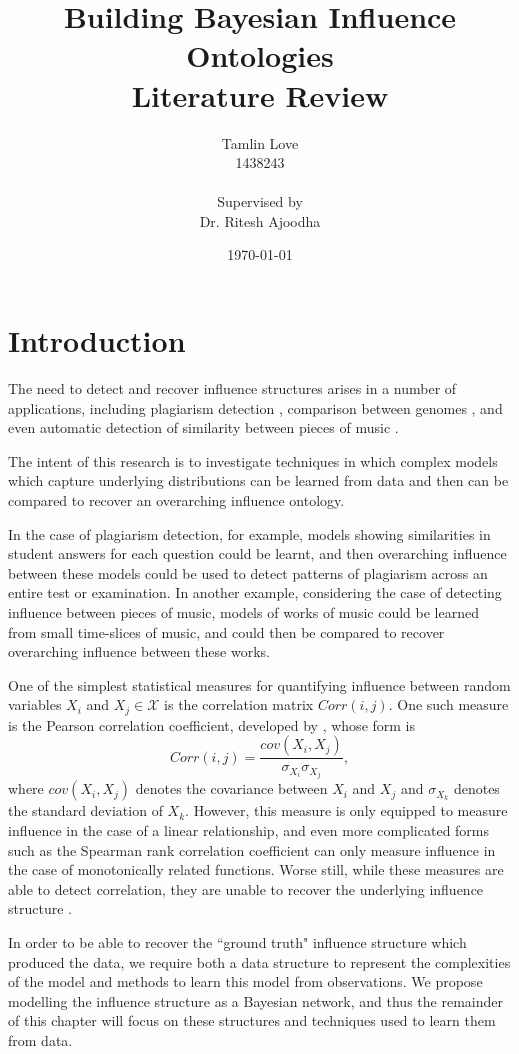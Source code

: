 \documentclass [11pt]{article}
\title{Building Bayesian Influence Ontologies\\Literature Review}
\author{Tamlin Love\\1438243\\\\Supervised by\\Dr. Ritesh Ajoodha}
\date{\today}
\begin{document}
\maketitle
\section{Introduction}
The need to detect and recover influence structures arises in a number of applications, including plagiarism detection \citep{merlo2007}, comparison between genomes \citep{koonin1999}, and even automatic detection of similarity between pieces of music \citep{slaney2008}.

The intent of this research is to investigate techniques in which complex models which capture underlying distributions can be learned from data and then can be compared to recover an overarching influence ontology. 

In the case of plagiarism detection, for example, models showing similarities in student answers for each question could be learnt, and then overarching influence between these models could be used to detect patterns of plagiarism across an entire test or examination. In another example, considering the case of detecting influence between pieces of music, models of works of music could be learned from small time-slices of music, and could then be compared to recover overarching influence between these works.

One of the simplest statistical measures for quantifying influence between random variables $X_{i}$ and $X_{j} \in \mathcal{X}$ is the correlation matrix $Corr(i,j)$. One such measure is the Pearson correlation coefficient, developed by \cite{pearson1895}, whose form is
\begin{equation*}
Corr(i,j) = \frac{cov(X_{i},X_{j})}{\sigma_{X_{i}} \sigma_{X_{j}}},
\end{equation*}
where $cov(X_{i},X_{j})$ denotes the covariance between $X_{i}$ and $X_{j}$ and $\sigma_{X_{k}}$ denotes the standard deviation of $X_{k}$. However, this measure is only equipped to measure influence in the case of a linear relationship, and even more complicated forms such as the Spearman rank correlation coefficient \citep{spearman1904} can only measure influence in the case of monotonically related functions. Worse still, while these measures are able to detect correlation, they are unable to recover the underlying influence structure \citep{damghani2012}.

In order to be able to recover the ``ground truth" influence structure which produced the data, we require both a data structure to represent the complexities of the model and methods to learn this model from observations. We propose modelling the influence structure as a Bayesian network, and thus the remainder of this chapter will focus on these structures and techniques used to learn them from data. 
\end{document}
